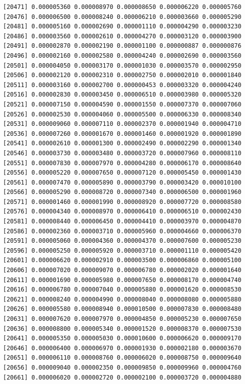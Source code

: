 \documentclass[]{article}
\begin{document}
\begin{verbatim}
[20471] 0.000005360 0.000008970 0.000008650 0.000006220 0.000005760
[20476] 0.000006500 0.000008240 0.000006210 0.000003660 0.000005290
[20481] 0.000005160 0.000002690 0.000001110 0.000004290 0.000003230
[20486] 0.000003560 0.000002610 0.000004270 0.000003120 0.000003900
[20491] 0.000002870 0.000002190 0.000001100 0.000000887 0.000000876
[20496] 0.000002160 0.000002580 0.000004240 0.000002690 0.000003560
[20501] 0.000004050 0.000003170 0.000001030 0.000003570 0.000002950
[20506] 0.000002120 0.000002310 0.000002750 0.000002010 0.000001840
[20511] 0.000003160 0.000002700 0.000000453 0.000003320 0.000004240
[20516] 0.000002830 0.000003450 0.000006510 0.000003980 0.000005320
[20521] 0.000007150 0.000004590 0.000001550 0.000007370 0.000007060
[20526] 0.000002530 0.000004060 0.000005500 0.000006330 0.000008340
[20531] 0.000009060 0.000007110 0.000002370 0.000001940 0.000004710
[20536] 0.000007260 0.000001670 0.000001460 0.000001920 0.000001890
[20541] 0.000002610 0.000001300 0.000002490 0.000002290 0.000001340
[20546] 0.000003730 0.000003480 0.000003720 0.000007960 0.000008110
[20551] 0.000007830 0.000007970 0.000004280 0.000006170 0.000008640
[20556] 0.000005220 0.000007650 0.000007120 0.000005450 0.000001430
[20561] 0.000007470 0.000005890 0.000003790 0.000003420 0.000010100
[20566] 0.000005290 0.000008720 0.000007340 0.000006500 0.000001960
[20571] 0.000001460 0.000001990 0.000008920 0.000007720 0.000008580
[20576] 0.000004340 0.000008970 0.000006410 0.000006510 0.000002430
[20581] 0.000008440 0.000006450 0.000004410 0.000003970 0.000004870
[20586] 0.000002360 0.000003710 0.000005960 0.000004660 0.000006370
[20591] 0.000005060 0.000004360 0.000004370 0.000007600 0.000005230
[20596] 0.000005250 0.000005920 0.000003710 0.000001110 0.000005420
[20601] 0.000006620 0.000002910 0.000003500 0.000006860 0.000005100
[20606] 0.000007020 0.000009070 0.000006780 0.000002020 0.000001640
[20611] 0.000001690 0.000005980 0.000007650 0.000008170 0.000004740
[20616] 0.000006780 0.000007040 0.000005880 0.000001620 0.000008530
[20621] 0.000008240 0.000004990 0.000008040 0.000008080 0.000005880
[20626] 0.000005580 0.000008940 0.000010500 0.000007830 0.000008480
[20631] 0.000007620 0.000007970 0.000004850 0.000005230 0.000007650
[20636] 0.000008800 0.000005340 0.000001520 0.000008370 0.000007530
[20641] 0.000005350 0.000005030 0.000010600 0.000006620 0.000009170
[20646] 0.000006400 0.000006970 0.000001930 0.000002180 0.000003670
[20651] 0.000006110 0.000008760 0.000006020 0.000008750 0.000009640
[20656] 0.000009040 0.000002350 0.000009850 0.000009960 0.000004760
[20661] 0.000006020 0.000002720 0.000002100 0.000003720 0.000004880

\end{verbatim}
\end{document}
